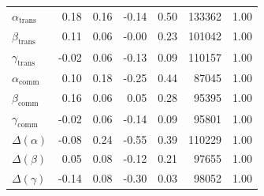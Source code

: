 \documentclass[doc,biblatex]{apa7}
\begin{document}
\begin{table}[h]
\begin{center}
\begin{threeparttable}
\begin{tabular}{lrrrrrr}
$\alpha_\mathrm{trans}$ & 0.18 & 0.16 & -0.14 & 0.50 & 133362 & 1.00 \\
$\beta_\mathrm{trans}$ & 0.11 & 0.06 & -0.00 & 0.23 & 101042 & 1.00 \\
$\gamma_\mathrm{trans}$ & -0.02 & 0.06 & -0.13 & 0.09 & 110157 & 1.00 \\
$\alpha_\mathrm{comm}$ & 0.10 & 0.18 & -0.25 & 0.44 & 87045 & 1.00 \\
$\beta_\mathrm{comm}$ & 0.16 & 0.06 & 0.05 & 0.28 & 95395 & 1.00 \\
$\gamma_\mathrm{comm}$ & -0.02 & 0.06 & -0.14 & 0.09 & 95801 & 1.00 \\
$\Delta(\alpha)$ & -0.08 & 0.24 & -0.55 & 0.39 & 110229 & 1.00 \\
$\Delta(\beta)$ & 0.05 & 0.08 & -0.12 & 0.21 & 97655 & 1.00 \\
$\Delta(\gamma)$ & -0.14 & 0.08 & -0.30 & 0.03 & 98052 & 1.00 \\
\bottomrule
\end{tabular}
\label{exp2_parameter_estimates}
\end{threeparttable}
\end{center}
\end{table}
\end{document}
